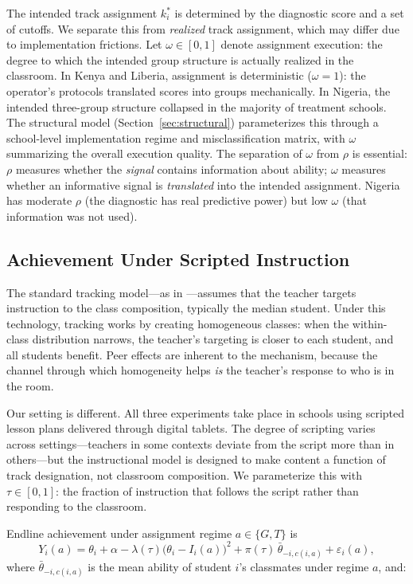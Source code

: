 \documentclass[11pt]{article}
\begin{document}
The intended track assignment $k_i^*$ is determined by the diagnostic score and a set of cutoffs. We separate this from \emph{realized} track assignment, which may differ due to implementation frictions. Let $\omega \in [0,1]$ denote assignment execution: the degree to which the intended group structure is actually realized in the classroom. In Kenya and Liberia, assignment is deterministic ($\omega = 1$): the operator's protocols translated scores into groups mechanically. In Nigeria, the intended three-group structure collapsed in the majority of treatment schools. The structural model (Section~\ref{sec:structural}) parameterizes this through a school-level implementation regime and misclassification matrix, with $\omega$ summarizing the overall execution quality. The separation of $\omega$ from $\rho$ is essential: $\rho$ measures whether the \emph{signal} contains information about ability; $\omega$ measures whether an informative signal is \emph{translated} into the intended assignment. Nigeria has moderate $\rho$ (the diagnostic has real predictive power) but low $\omega$ (that information was not used).

\subsection{Achievement Under Scripted Instruction}

The standard tracking model---as in \citet{duflo2011peer}---assumes that the teacher targets instruction to the class composition, typically the median student. Under this technology, tracking works by creating homogeneous classes: when the within-class distribution narrows, the teacher's targeting is closer to each student, and all students benefit. Peer effects are inherent to the mechanism, because the channel through which homogeneity helps \emph{is} the teacher's response to who is in the room.

Our setting is different. All three experiments take place in schools using scripted lesson plans delivered through digital tablets. The degree of scripting varies across settings---teachers in some contexts deviate from the script more than in others---but the instructional model is designed to make content a function of track designation, not classroom composition. We parameterize this with $\tau \in [0,1]$: the fraction of instruction that follows the script rather than responding to the classroom.

Endline achievement under assignment regime $a \in \{G, T\}$ is
\begin{equation}
\label{eq:learning}
Y_i(a) = \theta_i + \alpha - \lambda(\tau)\big(\theta_i - I_i(a)\big)^2 + \pi(\tau)\,\bar{\theta}_{-i,c(i,a)} + \varepsilon_i(a),
\end{equation}
where $\bar{\theta}_{-i,c(i,a)}$ is the mean ability of student $i$'s classmates under regime $a$, and:
\end{document}
